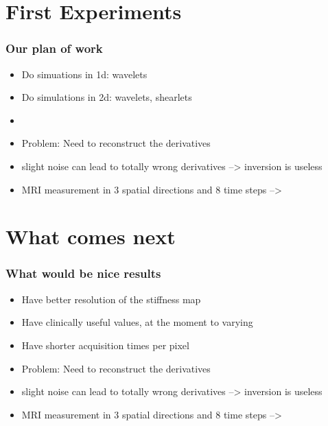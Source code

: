 \section{First Experiments}


\begin{frame}		\frametitle{Our plan of work}

\begin{itemize}
 \item Do simuations in 1d: wavelets
 \item Do simulations in 2d: wavelets, shearlets
 \item 
\end{itemize}

\begin{itemize}
 \item Problem: Need to reconstruct the derivatives
 \item slight noise can lead to totally wrong derivatives --> inversion is useless
 \item MRI measurement in 3 spatial directions and 8 time steps --> 
\end{itemize}

\end{frame}

\section{What comes next}


\begin{frame}		\frametitle{What would be nice results}

\begin{itemize}
 \item Have better resolution of the stiffness map
 \item Have clinically useful values, at the moment to varying
 \item Have shorter acquisition times per pixel
\end{itemize}

\begin{itemize}
 \item Problem: Need to reconstruct the derivatives
 \item slight noise can lead to totally wrong derivatives --> inversion is useless
 \item MRI measurement in 3 spatial directions and 8 time steps --> 
\end{itemize}

\end{frame}





 